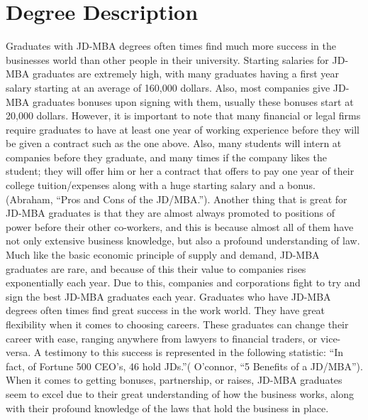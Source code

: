 \section{Degree Description}
	Graduates with JD-MBA degrees often times find much more success in the businesses world than other people in their university. Starting salaries for JD-MBA graduates are extremely high, with many graduates having a first year salary starting at an average of 160,000 dollars. Also, most companies give JD-MBA graduates bonuses upon signing with them, usually these bonuses start at 20,000 dollars. However, it is important to note that many financial or legal firms require graduates to have at least one year of working experience before they will be given a contract such as the one above. Also, many students will intern at companies before they graduate, and many times if the company likes the student; they will offer him or her a contract that offers to pay one year of their college tuition/expenses along with a huge starting salary and a bonus. (Abraham, “Pros and Cons of the JD/MBA.”). Another thing that is great for JD-MBA graduates is that they are almost always promoted to positions of power before their other co-workers, and this is because almost all of them have not only extensive business knowledge, but also a profound understanding of law. Much like the basic economic principle of supply and demand, JD-MBA graduates are rare, and because of this their value to companies rises exponentially each year.  Due to this, companies and corporations fight to try and sign the best JD-MBA graduates each year. Graduates who have JD-MBA degrees often times find great success in the work world. They have great flexibility when it comes to choosing careers. These graduates can change their career with ease, ranging anywhere from lawyers to financial traders, or vice-versa. A testimony to this success is represented in the following statistic: “In fact,  of Fortune 500 CEO’s, 46 hold JDs.”( O’connor, “5 Benefits of a JD/MBA”). When it comes to getting bonuses, partnership, or raises, JD-MBA graduates seem to excel due to their great understanding of how the business works, along with their profound knowledge of the laws that hold the business in place.

